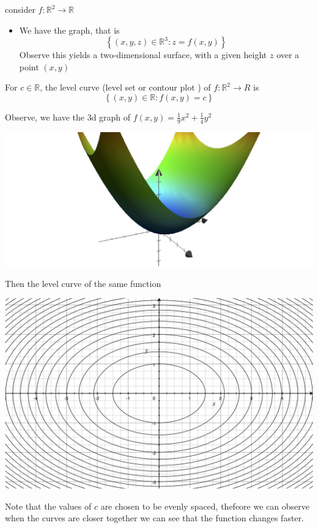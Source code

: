 \documentclass[11pt]{book}
\begin{document}
consider $f : \mathbb{R} ^2  \to \mathbb{R}  $ 
\begin{itemize}
    \item We have the graph, that is 
        \[
            \left\{ \left( x,y, z \right) \in  \mathbb{R} ^{3} : z= f\left(x, y\right)  \right\}    
        \]
        Observe this yields a two-dimensional surface, with a given height $z$ over a point $\left( x,y \right) $ 
\end{itemize}

\begin{defn}\label{defn:level_curve}
    For $c \in  \mathbb{R} $,  the level curve (level set or contour plot ) of $f : \mathbb{R} ^2  \to R $ is 
    \[
        \left\{ \left( x, y \right) \in \mathbb{R} : f\left(x,y\right) = c \right\} 
    \]
\end{defn}

Observe, we have the 3d graph of $f\left(x, y\right) = \frac{1}{9}x^2  + \frac{1}{4}y^2 $  

\begin{center}
    \includegraphics[width=0.7\columnwidth]{assets/3d-graph.jpg}
\end{center}

Then the level curve of the same function 

\begin{center}
    \includegraphics[width=0.7\columnwidth]{assets/level-c.jpg} 
\end{center}

Note that the values of $c$ are chosen to be evenly spaced, thefeore we can observe when the curves are closer together we can see that the function changes faster.
\end{document}
